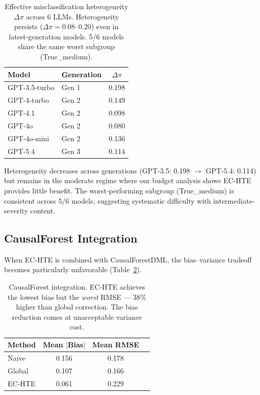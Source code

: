 \documentclass[11pt]{article}
\begin{document}
\begin{table}[t]
\centering
\small
\begin{tabular}{llc}
\toprule
Model & Generation & $\Delta\pi$ \\
\midrule
GPT-3.5-turbo & Gen 1 & 0.198 \\
GPT-4-turbo & Gen 2 & 0.149 \\
GPT-4.1 & Gen 2 & 0.098 \\
GPT-4o & Gen 2 & 0.080 \\
GPT-4o-mini & Gen 2 & 0.136 \\
GPT-5.4 & Gen 3 & 0.114 \\
\bottomrule
\end{tabular}
\caption{Effective misclassification heterogeneity $\Delta\pi$ across 6 LLMs. Heterogeneity persists ($\Delta\pi = 0.08$--$0.20$) even in latest-generation models. 5/6 models share the same worst subgroup (True\_medium).}
\label{tab:multi-llm}
\end{table}

Heterogeneity decreases across generations (GPT-3.5: 0.198 $\to$ GPT-5.4: 0.114) but remains in the moderate regime where our budget analysis shows EC-HTE provides little benefit.
The worst-performing subgroup (True\_medium) is consistent across 5/6 models, suggesting systematic difficulty with intermediate-severity content.

\subsection{CausalForest Integration}
\label{sec:causal-forest}

When EC-HTE is combined with CausalForestDML, the bias--variance tradeoff becomes particularly unfavorable (Table~\ref{tab:causal-forest}).

\begin{table}[t]
\centering
\small
\begin{tabular}{lccc}
\toprule
Method & Mean $|$Bias$|$ & Mean RMSE \\
\midrule
Naive & 0.156 & 0.178 \\
Global & 0.107 & 0.166 \\
EC-HTE & 0.061 & 0.229 \\
\bottomrule
\end{tabular}
\caption{CausalForest integration. EC-HTE achieves the lowest bias but the \emph{worst} RMSE --- 38\% higher than global correction. The bias reduction comes at unacceptable variance cost.}
\label{tab:causal-forest}
\end{table}
\end{document}

